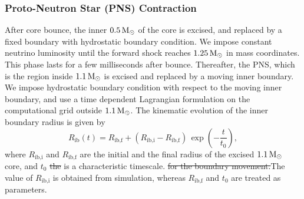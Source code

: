 \documentclass[fleqn,usenatbib]{mnras}
\newcommand{\solm}{\xspace\ensuremath{\rm{M_{\odot}}}\xspace}
\newcommand{\NY}[2]{{\color{blue}\sout{#1}#2}}
\begin{document}
\subsubsection{Proto-Neutron Star (PNS) Contraction}\label{subsec:pnscontr}

After core bounce, the inner $0.5\, \solm$ of the core is excised, and replaced by a fixed boundary with hydrostatic boundary condition. We impose constant neutrino luminosity until the forward shock reaches $1.25\, \solm$ in mass coordinates. This phase lasts for a few milliseconds after bounce. Thereafter, the PNS, which is the region inside $1.1\, \solm$ is  excised and replaced by a moving inner boundary. We impose hydrostatic boundary condition with respect to the moving inner boundary, and use a time dependent Lagrangian formulation on the computational grid outside $1.1\, \solm$. The kinematic evolution of the inner boundary radius is given by
\begin{equation}
    R_{\text{ib}}(t) = R_{\text{ib,f}} + (R_{\text{ib,i}} - R_{\text{ib,f}})\, \exp\left(-\frac{t}{t_0}\right),
\end{equation}
where $R_{\text{ib,i}}$ and $R_{\text{ib,f}}$ are the initial and the final radius of the excised $1.1\, \solm$ core, and $t_0$ \NY{the}{ is a} \NY{}{characteristic} timescale\NY{}{.} \NY{for the boundary movement.}{The value of $R_{\text{ib,i}}$ is obtained from simulation, whereas $R_{\text{ib,f}}$ and $t_0$ are treated as parameters.}
\end{document}

